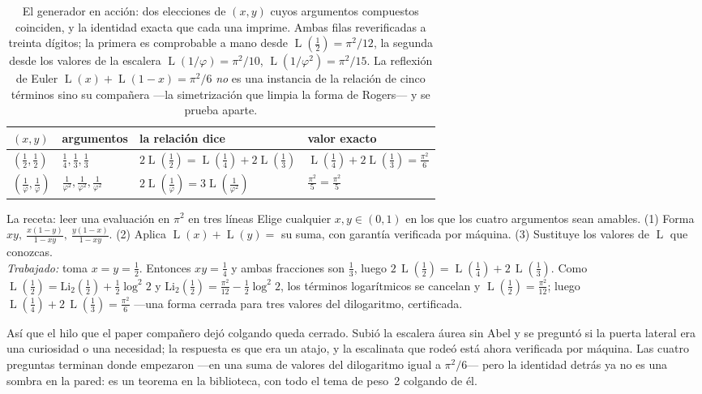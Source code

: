 \documentclass[11pt]{article}
\newcommand{\Li}{\mathrm{Li}_2}
\DeclareMathOperator{\Lrog}{L}
\begin{document}
\begin{table}[h]
\centering\small
{}
\begin{tabular}{@{}llll@{}}
\toprule
\rowcolor{ggteal!18} $(x,y)$ & argumentos & la relaci\'on dice & valor exacto \\
\midrule
$(\tfrac12,\tfrac12)$ & $\tfrac14,\tfrac13,\tfrac13$
  & $2\Lrog(\tfrac12)=\Lrog(\tfrac14)+2\Lrog(\tfrac13)$
  & $\Lrog(\tfrac14)+2\Lrog(\tfrac13)=\tfrac{\pi^2}{6}$ \\
$(\tfrac1\varphi,\tfrac1\varphi)$ & $\tfrac1{\varphi^2},\tfrac1{\varphi^2},\tfrac1{\varphi^2}$
  & $2\Lrog(\tfrac1\varphi)=3\Lrog(\tfrac1{\varphi^2})$
  & $\tfrac{\pi^2}{5}=\tfrac{\pi^2}{5}$ \\
\bottomrule
\end{tabular}
\caption{El generador en acci\'on: dos elecciones de $(x,y)$ cuyos argumentos compuestos
coinciden, y la identidad exacta que cada una imprime. Ambas filas reverificadas a treinta
d\'igitos; la primera es comprobable a mano desde $\Lrog(\tfrac12)=\pi^2/12$, la segunda
desde los valores de la escalera $\Lrog(1/\varphi)=\pi^2/10$, $\Lrog(1/\varphi^2)=\pi^2/15$.
La reflexi\'on de Euler $\Lrog(x)+\Lrog(1-x)=\pi^2/6$ \emph{no} es una instancia de la
relaci\'on de cinco t\'erminos sino su compa\~nera ---la simetrizaci\'on que limpia la forma
de Rogers--- y se prueba aparte.}
\label{tab:instances}
\end{table}

\begin{recipebox}{La receta: leer una evaluaci\'on en $\pi^2$ en tres l\'ineas}
Elige cualquier $x,y\in(0,1)$ en los que los cuatro argumentos sean amables. (1) Forma
$xy,\ \tfrac{x(1-y)}{1-xy},\ \tfrac{y(1-x)}{1-xy}$. (2) Aplica
$\Lrog(x)+\Lrog(y)=$ su suma, con garant\'ia verificada por m\'aquina. (3) Sustituye los
valores de $\Lrog$ que conozcas.\\[3pt]
\emph{Trabajado:} toma $x=y=\tfrac12$. Entonces $xy=\tfrac14$ y ambas fracciones son
$\tfrac13$, luego $2\,\Lrog(\tfrac12)=\Lrog(\tfrac14)+2\,\Lrog(\tfrac13)$. Como
$\Lrog(\tfrac12)=\Li(\tfrac12)+\tfrac12\log^2\!2$ y $\Li(\tfrac12)=\tfrac{\pi^2}{12}-
\tfrac12\log^2\!2$, los t\'erminos logar\'itmicos se cancelan y
$\Lrog(\tfrac12)=\tfrac{\pi^2}{12}$; luego $\Lrog(\tfrac14)+2\,\Lrog(\tfrac13)=
\tfrac{\pi^2}{6}$ ---una forma cerrada para tres valores del dilogaritmo, certificada.
\end{recipebox}

As\'i que el hilo que el paper compa\~nero dej\'o colgando queda cerrado. Subi\'o la escalera
\'aurea sin Abel y se pregunt\'o si la puerta lateral era una curiosidad o una necesidad; la
respuesta es que era un atajo, y la escalinata que rode\'o est\'a ahora verificada por
m\'aquina. Las cuatro preguntas terminan donde empezaron ---en una suma de valores del
dilogaritmo igual a $\pi^2/6$--- pero la identidad detr\'as ya no es una sombra en la pared:
es un teorema en la biblioteca, con todo el tema de peso~2 colgando de \'el.
\end{document}
